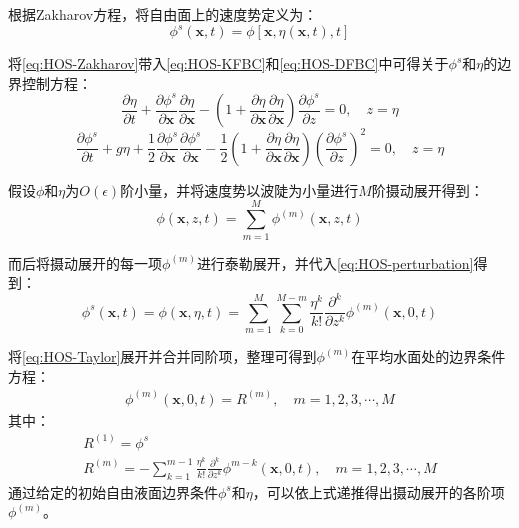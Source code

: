 根据Zakharov方程\cite{zakharovStabilityPeriodicWaves1968}，将自由面上的速度势定义为：
\begin{equation}
  \phi^s\left(\bm{x},t\right) = \phi\left[\bm{x},\eta\left(\bm{x},t\right),t\right]
  \label{eq:HOS-Zakharov}
\end{equation}

将\cref{eq:HOS-Zakharov}带入\cref{eq:HOS-KFBC}和\cref{eq:HOS-DFBC}中可得关于$\phi^s$和$\eta$的边界控制方程：
\begin{equation}
  \frac{\partial \eta}{\partial t} + \frac{\partial\phi^s}{\partial \bm{x}}\frac{\partial\eta}{\partial \bm{x}} %
  - \left(1 + \frac{\partial\eta}{\partial \bm{x}}\frac{\partial\eta}{\partial \bm{x}}\right)%
  \frac{\partial\phi^s}{\partial z} = 0,\quad z = \eta
  \label{eq:HOS-BCE-phi}
\end{equation}
\begin{equation}
  \frac{\partial\phi^s}{\partial t} + g\eta %
  + \frac{1}2\frac{\partial\phi^s}{\partial\bm{x}}\frac{\partial\phi^s}{\partial\bm{x}} %
  - \frac{1}2\left(1 + \frac{\partial\eta}{\partial \bm{x}}\frac{\partial\eta}{\partial \bm{x}}\right) %
  \left(\frac{\partial\phi^s}{\partial z}\right)^2 = 0,\quad z = \eta
  \label{eq:HOS-BCE-eta}
\end{equation}

假设$\phi$和$\eta$为$O\left(\epsilon\right)$阶小量，并将速度势以波陡为小量进行$M$阶摄动展开得到：
\begin{equation}
  \phi\left(\bm{x},z,t\right) = \sum_{m=1}^{M}\phi^{\left(m\right)}\left(\bm{x},z,t\right)
  \label{eq:HOS-perturbation}
\end{equation}

而后将摄动展开的每一项$\phi^{\left(m\right)}$进行泰勒展开，并代入\cref{eq:HOS-perturbation}得到：
\begin{equation}
  \phi^s\left(\bm{x},t\right) = \phi\left(\bm{x},\eta,t\right) %
  = \sum_{m=1}^{M}\sum_{k=0}^{M-m}\frac{\eta^k}{k!}\frac{\partial^k}{\partial z^k} %
  \phi^{\left(m\right)}\left(\bm{x},0,t\right)
  \label{eq:HOS-Taylor}
\end{equation}

将\cref{eq:HOS-Taylor}展开并合并同阶项，整理可得到$\phi^{\left(m\right)}$在平均水面处的边界条件方程：
\begin{eqnarray}
  \phi^{\left(m\right)}\left(\bm{x},0,t\right) = R^{\left(m\right)}, \quad m = 1, 2, 3, \cdots, M
\end{eqnarray}
其中：
\begin{subequations}
  \begin{gather}
    R^{\left(1\right)} = \phi^s \\
    R^{\left(m\right)} = - \sum_{k=1}^{m-1}\frac{\eta^k}{k!}\frac{\partial^k}{\partial z^k}\phi^{m-k}\left(\bm{x},0,t\right), %
    \quad m = 1, 2, 3, \cdots, M
  \end{gather}
\end{subequations}
通过给定的初始自由液面边界条件$\phi^s$和$\eta$，可以依上式递推得出摄动展开的各阶项$\phi^{\left(m\right)}$。

